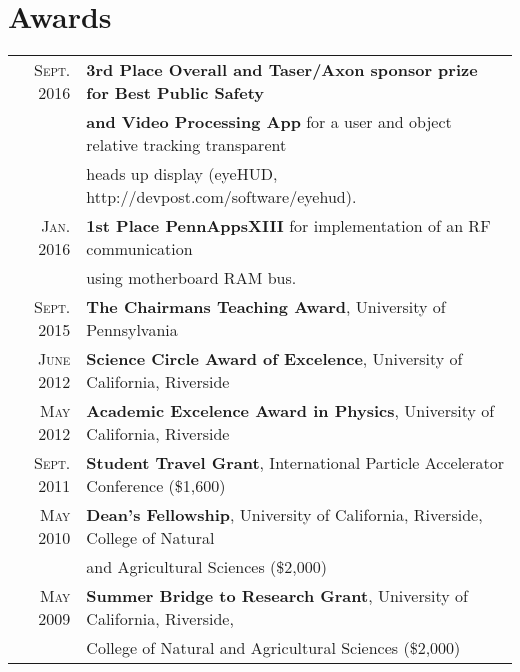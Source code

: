 \documentclass[a4paper,10pt]{article} %
\begin{document}

\section{Awards}

\begin{tabular}{rl}
\textsc{Sept.} 2016 & \textbf{3rd Place Overall and Taser/Axon sponsor prize for Best Public Safety} \\
					& \textbf{ and Video Processing App} for a user and object relative tracking transparent \\
					& heads up display (eyeHUD, http://devpost.com/software/eyehud). \\
\textsc{Jan.} 2016  & \textbf{1st Place PennAppsXIII} for implementation of an RF communication \\
 					& using motherboard RAM bus. \\
\textsc{Sept.} 2015 & \textbf{The Chairmans Teaching Award}, University of Pennsylvania \\
\textsc{June} 2012  & \textbf{Science Circle Award of Excelence}, University of California, Riverside \\
\textsc{May} 2012   & \textbf{Academic Excelence Award in Physics}, University of California, Riverside \\
\textsc{Sept.} 2011 & \textbf{Student Travel Grant}, International Particle Accelerator Conference \footnotesize(\$1,600)\normalsize\\
\textsc{May} 2010   & \textbf{Dean's Fellowship}, University of California, Riverside, College of Natural\\
				    & and Agricultural Sciences \footnotesize(\$2,000)\normalsize\\
\textsc{May} 2009   & \textbf{Summer Bridge to Research Grant}, University of California, Riverside, \\
			        & College of Natural and Agricultural Sciences \footnotesize(\$2,000)\normalsize\\

\end{tabular}

\end{document}
